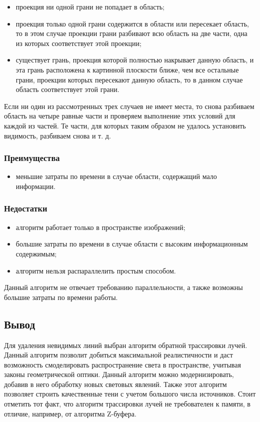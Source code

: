 \begin{itemize}
 \item	проекция ни одной грани не попадает в область;
\item	проекция только одной грани содержится в области или пересекает область, то в этом случае проекции грани разбивают всю область на две части, одна из которых соответствует этой проекции;
\item	существует грань, проекция которой полностью накрывает данную область, и эта грань расположена к картинной плоскости ближе, чем все остальные грани, проекции которых пересекают данную область, то в данном случае область соответствует этой грани.
\end{itemize}
 
 Если ни один из рассмотренных трех случаев не имеет места, то снова разбиваем область на четыре равные части и проверяем выполнение этих условий для каждой из частей. Те части, для которых таким образом не удалось установить видимость, разбиваем снова и т. д.
 
\subsubsection*{Преимущества}
\begin{itemize}
\item	меньшие затраты по времени в случае области, содержащий мало информации.
\end{itemize}


\subsubsection*{Недостатки}
 \begin{itemize}
\item	алгоритм работает только в пространстве изображений;
\item	большие затраты по времени в случае области с высоким информационным содержимым;
\item   алгоритм нельзя распараллелить простым способом.
\end{itemize}

 Данный алгоритм не отвечает требованию параллельности, а также возможны большие затраты по времени работы.
 
 
\subsection{Вывод}
Для удаления невидимых линий выбран алгоритм обратной трассировки лучей. Данный алгоритм позволит добиться максимальной реалистичности и даст возможность смоделировать распространение света в пространстве, учитывая законы геометрической оптики. Данный алгоритм можно модернизировать, добавив в него обработку новых световых явлений. Также этот алгоритм позволяет строить качественные тени с учетом большого числа источников. Стоит отметить тот факт, что алгоритм трассировки лучей не требователен к памяти, в отличие, например, от алгоритма Z-буфера.


